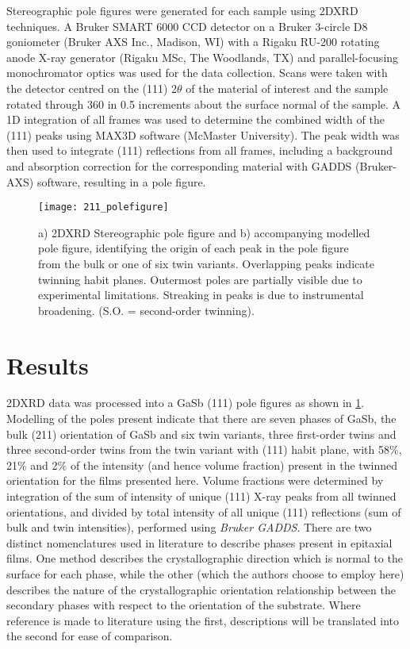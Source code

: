Stereographic pole figures were generated for each sample using 2DXRD techniques.
A Bruker SMART 6000 CCD detector on a Bruker 3-circle D8 goniometer (Bruker AXS Inc., Madison, WI) with a Rigaku RU-200 rotating anode X-ray generator (Rigaku MSc, The Woodlands, TX) and parallel-focusing monochromator optics was used for the data collection.
Scans were taken with the detector centred on the (111) 2\(\theta\) of the material of interest and the sample rotated through 360\degree{} in 0.5\degree{} increments about the surface normal of the sample.
A 1D integration of all frames was used to determine the combined width of the (111) peaks using MAX3D software (McMaster University)\cite{Britten2007}.
The peak width was then used to integrate (111) reflections from all frames, including a background and absorption correction for the corresponding material with GADDS (Bruker-AXS) software, resulting in a pole figure.
\begin{figure}
 \centering \texttt{[image: 211\_polefigure]}
 \caption[Measured and simulated pole figure of thin film on 211 silicon]{\label{fig:211_polefigure}a) 2DXRD Stereographic pole figure and b) accompanying modelled pole figure, identifying the origin of each peak in the pole figure from the bulk or one of six twin variants.
  Overlapping peaks indicate twinning habit planes.
  Outermost poles are partially visible due to experimental limitations.
  Streaking in peaks is due to instrumental broadening.
  (S.O. = second-order twinning).}
\end{figure}

\section{Results}
2DXRD data was processed into a GaSb (111) pole figures as shown in \cref{fig:211_polefigure}.
Modelling of the poles present indicate that there are seven phases of GaSb, the bulk (211) orientation of GaSb and six twin variants, three first-order twins and three second-order twins from the twin variant with (111) habit plane, with 58\%, 21\% and 2\% of the intensity (and hence volume fraction) present in the twinned orientation for the films presented here.
Volume fractions were determined by integration of the sum of intensity of unique (111) X-ray peaks from all twinned orientations, and divided by total intensity of all unique (111) reflections (sum of bulk and twin intensities), performed using \textit{Bruker GADDS}.
There are two distinct nomenclatures used in literature to describe phases present in epitaxial films\cite{Kim2010a,Lange1991,Johnson2011,DeLyon1995}.
One method describes the crystallographic direction which is normal to the surface for each phase, while the other (which the authors choose to employ here) describes the nature of the crystallographic orientation relationship between the secondary phases with respect to the orientation of the substrate.
Where reference is made to literature using the first, descriptions will be translated into the second for ease of comparison.

